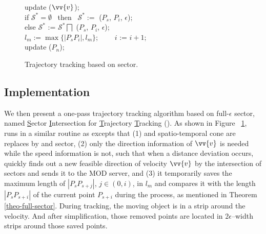 \begin{figure}[tb!]
\begin{center}
{\begin{minipage}{3.3in}
{					\icc \>\hspace{7ex}    update ($\vv{v}$); \\
					\icc \>\hspace{3ex} if $\mathcal{S}^*=\emptyset$ ~then~ $\mathcal{S}^*:=$ ($P_s$, $P_{i}$, $\epsilon$); \\
					\icc \>\hspace{3ex} else $\mathcal{S}^*$ := $\mathcal{S}^*\bigsqcap$ ($P_s$, $P_{i}$, $\epsilon$);\\
					\icc \>\hspace{3ex} $l_{m} := \max\{|P_sP_{i}|, l_{m}\}$; ~~~~$i$ := $i +1$;\\
					\icc \>\hspace{0ex} update ($P_{n}$); 
				}
				\vspace{-2ex}
				\myhrule
			\end{minipage}
		}
	\end{center}
	\vspace{-2ex}
	\caption{\small Trajectory tracking based on sector.}
	\label{alg:sitt}
	\vspace{-1ex}
\end{figure}

\subsection{Implementation}

We then present a one-pass trajectory tracking algorithm based on full-$\epsilon$ sector, named \underline{S}ector \underline{I}ntersection for \underline{T}rajectory \underline{T}racking (\sitt). As shown in Figure ~\ref{alg:sitt}, \sitt runs in a similar routine as \citt excepts that (1) \sed and spatio-temporal cone are replaces by \ped and sector, (2) only the direction information of $\vv{v}$ is needed while the speed information is not, such that when a distance deviation occurs, \sitt quickly finds out a new feasible direction of velocity $\vv{v}$ by the intersection of sectors and sends it to the MOD server, and (3) it temporarily saves the maximum length of $|P_sP_{s+j}|$, $j\in (0, i)$, in $l_m$ and compares it with the length $|P_sP_{s+i}|$ of the current point $P_{s+i}$ during the process, as mentioned in Theorem \ref{theo-full-sector}. 
%
During tracking, the moving object is in a strip around the velocity. And after simplification, those removed points are located in $2\epsilon$--width strips around those saved points.

